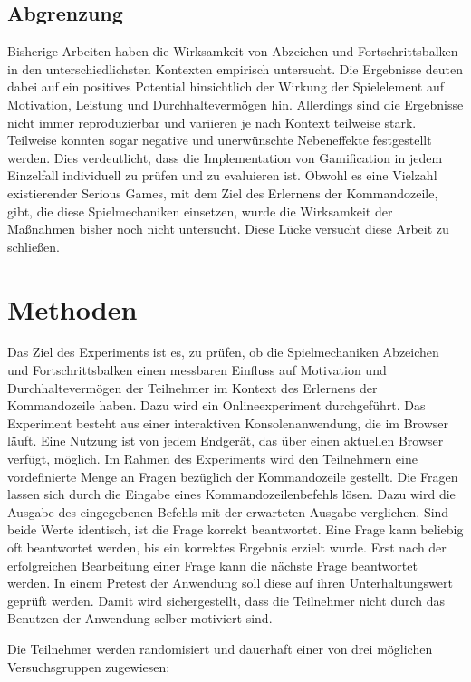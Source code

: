 \documentclass[
    a4paper,
    doc,
    12pt,
    natbib,
]{apa6}
\begin{document}
\subsection{Abgrenzung}
Bisherige Arbeiten haben die Wirksamkeit von Abzeichen und Fortschrittsbalken in den unterschiedlichsten Kontexten empirisch untersucht.
Die Ergebnisse deuten dabei auf ein positives Potential hinsichtlich der Wirkung der Spielelement auf Motivation, Leistung und Durchhaltevermögen hin. Allerdings sind die Ergebnisse nicht immer reproduzierbar und variieren je nach Kontext teilweise stark. Teilweise konnten sogar negative und unerwünschte Nebeneffekte festgestellt werden. Dies verdeutlicht, dass die Implementation von Gamification in jedem Einzelfall individuell zu prüfen und zu evaluieren ist.
Obwohl es eine Vielzahl existierender Serious Games, mit dem Ziel des Erlernens der Kommandozeile, gibt, die diese Spielmechaniken einsetzen, wurde die Wirksamkeit der Maßnahmen bisher noch nicht untersucht. Diese Lücke versucht diese Arbeit zu schließen.

\section{Methoden}
Das Ziel des Experiments ist es, zu prüfen, ob die Spielmechaniken Abzeichen und Fortschrittsbalken einen messbaren Einfluss auf Motivation und Durchhaltevermögen der Teilnehmer im Kontext des Erlernens der Kommandozeile haben. Dazu wird ein Onlineexperiment durchgeführt. Das Experiment besteht aus einer interaktiven Konsolenanwendung, die im Browser läuft. Eine Nutzung ist von jedem Endgerät, das über einen aktuellen Browser verfügt, möglich. Im Rahmen des Experiments wird den Teilnehmern eine vordefinierte Menge an Fragen bezüglich der Kommandozeile gestellt. Die Fragen lassen sich durch die Eingabe eines Kommandozeilenbefehls lösen. Dazu wird die Ausgabe des eingegebenen Befehls mit der erwarteten Ausgabe verglichen. Sind beide Werte identisch, ist die Frage korrekt beantwortet. Eine Frage kann beliebig oft beantwortet werden, bis ein korrektes Ergebnis erzielt wurde. Erst nach der erfolgreichen Bearbeitung einer Frage kann die nächste Frage beantwortet werden.
In einem Pretest der Anwendung soll diese auf ihren Unterhaltungswert geprüft werden. Damit wird sichergestellt, dass die Teilnehmer nicht durch das Benutzen der Anwendung selber motiviert sind. 
  
Die Teilnehmer werden randomisiert und dauerhaft einer von drei möglichen Versuchsgruppen zugewiesen:
\end{document}
